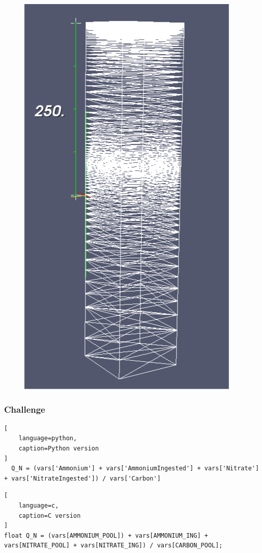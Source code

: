 \documentclass[t]{beamer}
\begin{document}
\begin{frame}[c]

\begin{figure}[H]
  \begin{center}
    \includegraphics[height=0.9\textheight,natwidth=402,natheight=755]{images/fluidity-mesh.jpg}
  \end{center}
\end{figure}

\end{frame}

\begin{frame}[fragile,c]
\frametitle{\huge Challenge}
\begin{lstlisting}[
	language=python,
	caption=Python version
]
  Q_N = (vars['Ammonium'] + vars['AmmoniumIngested'] + vars['Nitrate'] + vars['NitrateIngested']) / vars['Carbon']
\end{lstlisting}

\begin{lstlisting}[
	language=c,
	caption=C version
]
float Q_N = (vars[AMMONIUM_POOL]) + vars[AMMONIUM_ING] + vars[NITRATE_POOL] + vars[NITRATE_ING]) / vars[CARBON_POOL];
\end{lstlisting}

\end{frame}
\end{document}
